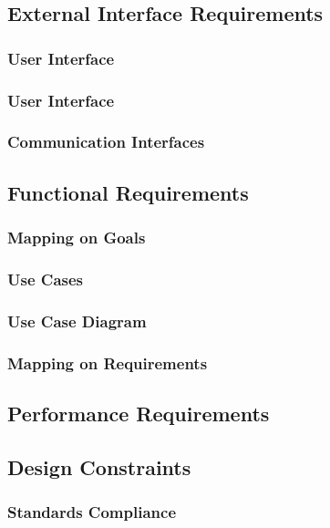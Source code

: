 \documentclass{article}
\begin{document}
\subsection{External Interface Requirements }

\subsubsection{User Interface}

\subsubsection{User Interface}

\subsubsection{Communication Interfaces}

\subsection{Functional Requirements}

\subsubsection{Mapping on Goals}

\subsubsection{Use Cases}

\subsubsection{Use Case Diagram}

\subsubsection{Mapping on Requirements}

\subsection{Performance Requirements}

\subsection{Design Constraints}

\subsubsection{Standards Compliance}
\end{document}
